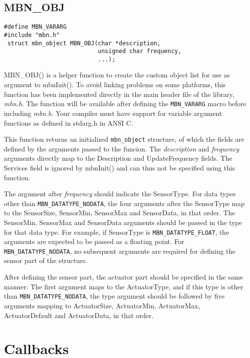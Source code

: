 \documentclass[a4paper]{report}
\begin{document}
\subsection{MBN\_OBJ}
\begin{verbatim}
#define MBN_VARARG
#include "mbn.h"
 struct mbn_object MBN_OBJ(char *description,
                           unsigned char frequency,
                           ...);
\end{verbatim}
MBN\_OBJ() is a helper function to create the custom object list for use as argument to mbnInit(). To avoid linking problems on some platforms, this function has been implemented directly in the main header file of the library, \textit{mbn.h}. The function will be available after defining the \verb|MBN_VARARG| macro before including \textit{mbn.h}. Your compiler must have support for variable argument functions as defined in stdarg.h in ANSI C.

This function returns an initialized \verb|mbn_object| structure, of which the fields are defined by the arguments passed to the funcion. The \textit{description} and \textit{frequency} arguments directly map to the Description and UpdateFrequency fields. The Services field is ignored by mbnInit() and can thus not be specified using this function.

The argument after \textit{frequency} should indicate the SensorType. For data types other than \verb|MBN_DATATYPE_NODATA|, the four arguments after the SensorType map to the SensorSize, SensorMin, SensorMax and SensorData, in that order. The SensorMin, SensorMax and SensorData arguments should be passed in the type for that data type. For example, if SensorType is \verb|MBN_DATATYPE_FLOAT|, the arguments are expected to be passed as a floating point. For \verb|MBN_DATATYPE_NODATA|, no subsequent arguments are required for defining the sensor part of the structure.

After defining the sensor part, the actuator part should be specified in the same manner: The first argument maps to the ActuatorType, and if this type is other than \verb|MBN_DATATYPE_NODATA|, the type argument should be followed by five arguments mapping to ActuatorSize, ActuatorMin, ActuatorMax, ActuatorDefault and ActuatorData, in that order.




\cleardoublepage
\section{Callbacks}
\label{sec:cb}
\end{document}
